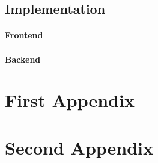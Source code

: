 \documentclass{hasel_thesis}
\begin{document}
\section{Implementation}
\subsubsection{Frontend}
\subsubsection{Backend}






\appendix
\chapter{First Appendix}
\chapter{Second Appendix}

\backmatter


\end{document}
